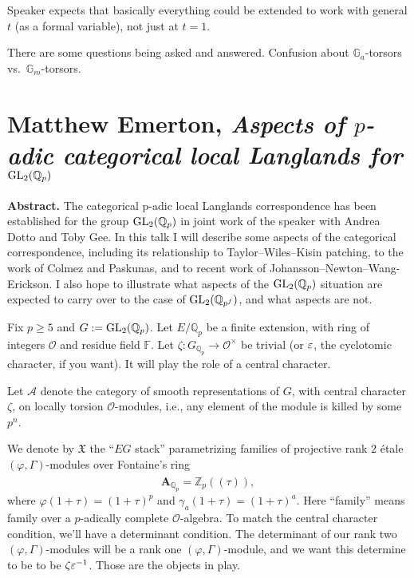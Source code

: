 \documentclass[reqno]{amsart} 
\begin{document}
\begin{remark}
  Speaker expects that basically everything could be extended to work with general $t$ (as a formal variable), not just at $t = 1$.
\end{remark}

There are some questions being asked and answered.   Confusion about $\mathbb{G}_a$-torsors vs.\ $\mathbb{G}_m$-torsors.

\part{Matthew Emerton, \emph{Aspects of $p$-adic categorical local Langlands for $\operatorname{GL}_2(\mathbb{Q}_p)$}}

\textbf{Abstract.}
The categorical p-adic local Langlands correspondence has been established for the group $\operatorname{GL}_2(\mathbb{Q}_p)$ in joint work of the speaker with Andrea Dotto and Toby Gee. In this talk I will describe some aspects of the categorical correspondence, including its relationship to Taylor--Wiles--Kisin patching, to the work of Colmez and Paskunas, and to recent work of Johansson--Newton--Wang-Erickson. I also hope to illustrate what aspects of the $\operatorname{GL}_2(\mathbb{Q}_p)$ situation are expected to carry over to the case of $\operatorname{GL}_2(\mathbb{Q}_{p^f})$, and what aspects are not.

Fix $p \geq 5$ and $G := \operatorname{GL}_2(\mathbb{Q}_p)$.  Let $E / \mathbb{Q}_p$ be a finite extension, with ring of integers $\mathcal{O}$ and residue field $\mathbb{F}$.  Let $\zeta : G_{\mathbb{Q}_p} \rightarrow \mathcal{O}^\times$ be trivial (or $\varepsilon$, the cyclotomic character, if you want).  It will play the role of a central character.

Let $\mathcal{A}$ denote the category of smooth representations of $G$, with central character $\zeta$, on locally torsion $\mathcal{O}$-modules, i.e., any element of the module is killed by some $p^n$.

We denote by $\mathfrak{X}$ the ``$E G$ stack'' parametrizing families of projective rank $2$ {\'e}tale $(\varphi, \Gamma)$-modules over Fontaine's ring
\begin{equation*}
  \mathbf{A}_{\mathbb{Q}_p} = \widehat{\mathbb{Z}_p((\tau))},
\end{equation*}
where $\varphi(1 + \tau) =(1 + \tau)^p$ and $\gamma_a(1 + \tau) =(1 + \tau)^a$.  Here ``family'' means family over a $p$-adically complete $\mathcal{O}$-algebra.  To match the central character condition, we'll have a determinant condition.  The determinant of our rank two $(\varphi, \Gamma)$-modules will be a rank one $(\varphi, \Gamma)$-module, and we want this determine to be to be $\zeta \varepsilon^{-1}$.  Those are the objects in play.
\end{document}
